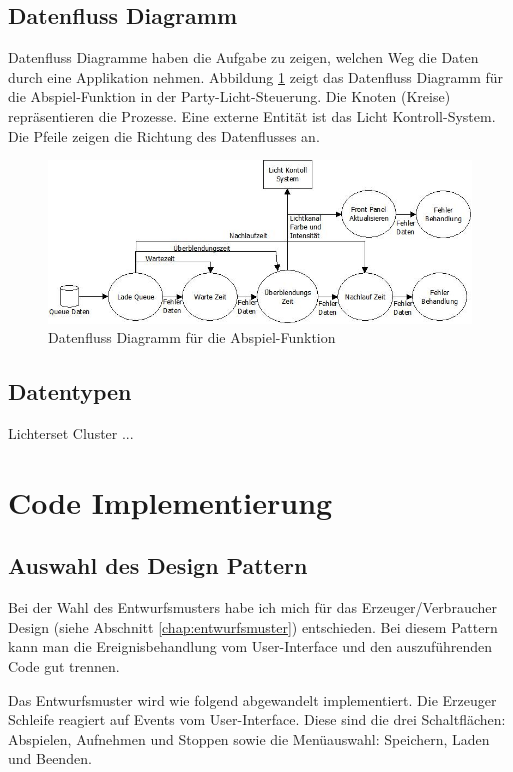 \subsection{Datenfluss Diagramm}
Datenfluss Diagramme haben die Aufgabe zu zeigen, welchen Weg die Daten durch eine Applikation nehmen. Abbildung \ref{fig:plan02} zeigt das Datenfluss Diagramm für die Abspiel-Funktion in der Party-Licht-Steuerung. Die Knoten (Kreise) repräsentieren die Prozesse. Eine externe Entität ist das Licht Kontroll-System. Die Pfeile zeigen die Richtung des Datenflusses an.
	\begin{figure}[h!]
	\centering
		\includegraphics[width=\textwidth]{Pics/play-dataflow.jpeg}
	\caption{Datenfluss Diagramm für die Abspiel-Funktion}
	\label{fig:plan02}
	\end{figure}	

\subsection{Datentypen}
Lichterset Cluster ...
	

\section{Code Implementierung}
		\subsection{Auswahl des Design Pattern} %
		\label{chap:designpattern}
		Bei der Wahl des Entwurfsmusters habe ich mich für das Erzeuger/Verbraucher Design  (siehe Abschnitt \ref{chap:entwurfsmuster}) entschieden. Bei diesem Pattern kann man die Ereignisbehandlung vom User-Interface und den auszuführenden Code gut trennen. 

Das Entwurfsmuster wird wie folgend abgewandelt implementiert.  Die Erzeuger Schleife reagiert auf Events vom User-Interface. Diese sind die drei Schaltflächen: Abspielen, Aufnehmen und Stoppen sowie die Menüauswahl: Speichern, Laden und Beenden.

